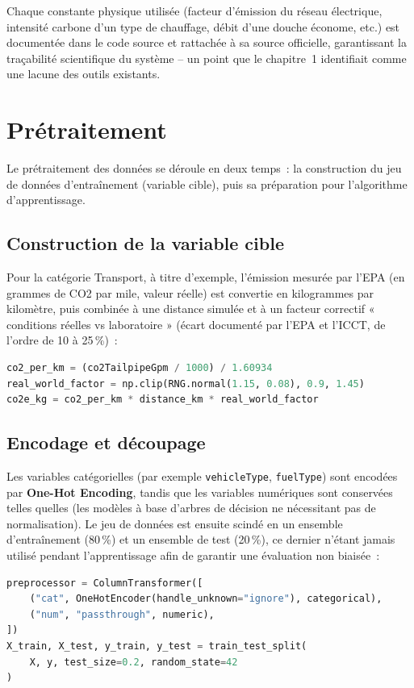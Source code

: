 Chaque constante physique utilisée (facteur d'émission du réseau électrique, intensité carbone d'un type de chauffage, débit d'une douche économe, etc.) est documentée dans le code source et rattachée à sa source officielle, garantissant la traçabilité scientifique du système -- un point que le chapitre~1 identifiait comme une lacune des outils existants.

\section{Prétraitement}

Le prétraitement des données se déroule en deux temps~: la construction du jeu de données d'entraînement (variable cible), puis sa préparation pour l'algorithme d'apprentissage.

\subsection{Construction de la variable cible}
Pour la catégorie Transport, à titre d'exemple, l'émission mesurée par l'EPA (en grammes de CO2 par mile, valeur réelle) est convertie en kilogrammes par kilomètre, puis combinée à une distance simulée et à un facteur correctif « conditions réelles vs laboratoire » (écart documenté par l'EPA et l'ICCT, de l'ordre de 10 à 25\,\%)~:

\begin{lstlisting}[language=Python]
co2_per_km = (co2TailpipeGpm / 1000) / 1.60934
real_world_factor = np.clip(RNG.normal(1.15, 0.08), 0.9, 1.45)
co2e_kg = co2_per_km * distance_km * real_world_factor
\end{lstlisting}

\subsection{Encodage et découpage}
Les variables catégorielles (par exemple \texttt{vehicleType}, \texttt{fuelType}) sont encodées par \textbf{One-Hot Encoding}, tandis que les variables numériques sont conservées telles quelles (les modèles à base d'arbres de décision ne nécessitant pas de normalisation). Le jeu de données est ensuite scindé en un ensemble d'entraînement (80\,\%) et un ensemble de test (20\,\%), ce dernier n'étant jamais utilisé pendant l'apprentissage afin de garantir une évaluation non biaisée~:

\begin{lstlisting}[language=Python]
preprocessor = ColumnTransformer([
    ("cat", OneHotEncoder(handle_unknown="ignore"), categorical),
    ("num", "passthrough", numeric),
])
X_train, X_test, y_train, y_test = train_test_split(
    X, y, test_size=0.2, random_state=42
)
\end{lstlisting}

